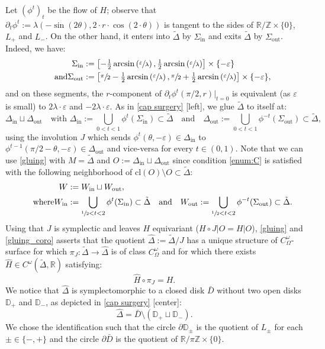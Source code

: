\documentclass[JEP,XML,SOM,Unicode,NoFloatCountersInSection,Unicode,published]{cedram}
\let\epsilon\varepsilon
\newcommand{\cl}{\mathrm{cl}}
\newcommand\R{\mathbb R}
\newcommand\D{\mathbb D}
\newcommand\Z{\mathbb Z}
\newcommand\qand{\quad \text{and}\quad}
\theoremstyle{definition}
\begin{document}
Let $(\phi^t)_t$ be the flow of $H$; observe that $\partial_t \phi^t:= \lambda(-\sin(2\theta), 2\cdot r\cdot \cos(2\cdot \theta))$ is tangent to the sides of $\R/\Z\times \{0\}$, $L_+$ and $L_-$.
On the other hand, it enters into $\tilde \Delta$ by $\Sigma_\mathrm{in}$ and exits $\tilde \Delta$ by $\Sigma_\mathrm{out}$. Indeed, we have:
\begin{align*}
\Sigma_\mathrm{in}&:= \left[- \tfrac12 \arcsin\left(\sfrac \epsilon\lambda \right),\tfrac12 \arcsin\left(\sfrac \epsilon\lambda \right)\right]\times \{-\epsilon\}\\
\tag*{and}
\Sigma_\mathrm{out}&:= \left[\sfrac\pi2 - \tfrac12 \arcsin\left(\sfrac \epsilon\lambda \right),\sfrac\pi2 +\tfrac12 \arcsin\left(\sfrac \epsilon\lambda \right)\right]\times \{-\epsilon\},
\end{align*}
and on these segments, the $r$-component of $ \partial_t \phi^t(\pi/2, r)|_{t=0}$ is equivalent (as $\epsilon$ is small) to \resp $2\lambda \cdot \epsilon$ and $-2\lambda \cdot \epsilon$.
As in \cref{cap surgery} [left], we glue $\tilde \Delta$ to itself at:
\[
\Delta_\mathrm{in}\sqcup \Delta_\mathrm{out}\quad \text{with }
\Delta_\mathrm{in}:=
\bigcup_{0< t<1} \phi^{t}(\Sigma_\mathrm{in}) \subset \tilde \Delta \qand \Delta_\mathrm{out}
:= \bigcup_{0< t<1} \phi^{-t}(\Sigma_\mathrm{out}) \subset \tilde \Delta,
\]
using the involution $J$ which sends $\phi^{t}(\theta, -\epsilon)\in \Delta_\mathrm{in}$ to $\phi^{t-1}(\pi/2-\theta, -\epsilon)\in \Delta_\mathrm{out}$ and vice-versa for every $t\in (0,1)$. Note that we can use \cref{gluing} with $M=\tilde \Delta$ and $O:= \Delta_\mathrm{in}\sqcup \Delta_\mathrm{out}$ since condition \eqref{enum:C} is satisfied with the following neighborhood of $\cl(O)\setminus O \subset \tilde \Delta$:
\begin{align*}
W&:=W_\mathrm{in}\sqcup W_\mathrm{out},\\
\tag*{where}
W_\mathrm{in}
&:= \bigcup_{\sfrac12 <t<2} \phi^t(\Sigma_\mathrm{in}) \subset \tilde \Delta
\qand
W_\mathrm{out}:= \bigcup_{\sfrac12 <t<2} \phi^{-t}(\Sigma_\mathrm{out})\subset \tilde \Delta.
\end{align*}
Using that $J$ is symplectic and leaves $H$ equivariant ($H\circ J|O= H|O$), \cref{gluing} and \cref{gluing_coro} asserts that the quotient $\widehat \Delta:= \tilde \Delta/J$ has a unique structure of $C^\omega_\Omega$\nobreakdash-surface for which $\pi_J: \tilde \Delta\to \widehat \Delta$ is of class $C^\omega_\Omega$ and for which there exists $\widehat H\in C^\omega(\tilde \Delta, \R)$ satisfying:
\[\widehat H\circ \pi_J= H.\]
We notice that $\widehat \Delta$ is symplectomorphic to a closed disk $\bar D$ without two open disks $\D_+$ and $\D_-$, as depicted in \cref{cap surgery} [center]:
\[\widehat \Delta= \bar D \setminus (\D_+ \sqcup \D_-).\]
We chose the identification such that the circle $\partial \D_\pm $ is the quotient of $L_\pm$ for each $\pm\in\{ -,+\}$ and the circle $\partial \bar D $ is the quotient of $\R/\pi \Z\times \{0\}$.
\end{document}
